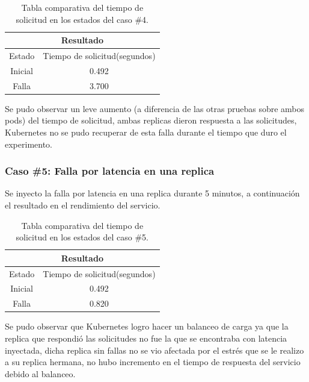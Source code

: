 \begin{table}[ht!]
\begin{center}
\begin{tabular}{ |c|c| } 
 \hline
 \multicolumn{2}{|c|}{Resultado} \\
 \hline
 \hline
 Estado & Tiempo de solicitud(segundos)\\
 \hline
 Inicial & 0.492\\
 Falla & 3.700\\
 \hline
\end{tabular}
\end{center}
\caption{Tabla comparativa del tiempo de solicitud en los estados del caso \#4.}
\label{tab:tabla48}
\end{table}

\par Se pudo observar un leve aumento (a diferencia de las otras pruebas sobre ambos pods) del tiempo de solicitud, ambas replicas dieron respuesta a las solicitudes, Kubernetes no se pudo recuperar de esta falla durante el tiempo que duro el experimento.\\

\subsubsection{Caso \#5: Falla por latencia en una replica}

\par Se inyecto la falla por latencia en una replica durante 5 minutos, a continuación el resultado en el rendimiento del servicio.\\

\begin{table}[ht!]
\begin{center}
\begin{tabular}{ |c|c| } 
 \hline
 \multicolumn{2}{|c|}{Resultado} \\
 \hline
 \hline
 Estado & Tiempo de solicitud(segundos)\\
 \hline
 Inicial & 0.492\\
 Falla & 0.820\\
 \hline
\end{tabular}
\end{center}
\caption{Tabla comparativa del tiempo de solicitud en los estados del caso \#5.}
\label{tab:tabla49}
\end{table}

\par Se pudo observar que Kubernetes logro hacer un balanceo de carga ya que la replica que respondió las solicitudes no fue la que se encontraba con latencia inyectada, dicha replica sin fallas no se vio afectada por el estrés que se le realizo a su replica hermana, no hubo incremento en el tiempo de respuesta del servicio debido al balanceo.\\

